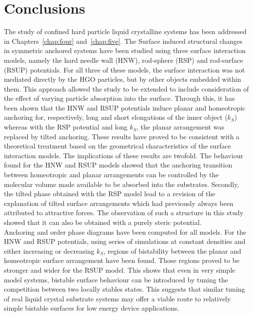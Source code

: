 

\section{Conclusions}

The study of confined hard particle liquid crystalline systems has been addressed 
in Chapters~\ref{chap:four} and~\ref{chap:five}. The Surface induced structural 
changes in symmetric anchored systems have
been studied using three surface interaction models, namely the hard needle wall (HNW),
rod-sphere (RSP) and rod-surface (RSUP) potentials.  For all three of these models, the surface
interaction was not mediated directly by the HGO particles, but by other objects embedded
within them. This approach allowed the study to be extended to include consideration of 
the effect of varying particle
absorption into the surface. Through this, it has been shown that the HNW and RSUP potentials 
induce planar
and homeotropic anchoring for, respectively, long and short elongations of the inner object
($k_S$) whereas with the RSP potential and long $k_S$, the planar arrangement was replaced by 
tilted anchoring. These results have proved to be consistent with a theoretical
treatment based on the geometrical characteristics of the surface interaction models.
The implications of these results are twofold. The behaviour found for the HNW and RSUP models
showed that the anchoring transition between
homeotropic and planar arrangements can be controlled by the molecular volume made available to
be absorbed into the substrates. Secondly, the tilted phase obtained with the RSP model lead to
a revision of the
explanation of tilted surface arrangements which had previously always been attributed to
attractive forces. The observation of such a structure in this study showed that it can also be
obtained with a purely steric potential.\\
Anchoring and order phase diagrams have been computed for all models. For the HNW
and RSUP potentials, using series of simulations at constant densities and either increasing or
decreasing $k_S$, regions of bistability between the planar and homeotropic surface arrangement
have been found. Those regions proved to be stronger and wider for the RSUP model. 
This shows that even in very simple model systems, bistable surface behaviour can be introduced
by tuning the competition between two locally stables states. This suggests that similar tuning
of real liquid crystal substrate systems may offer a viable route to relatively simple bistable
surfaces for low energy device applications.\\


